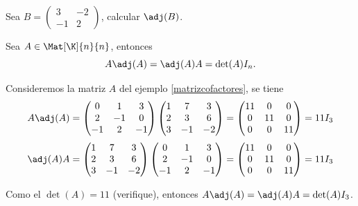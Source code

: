 \documentclass[compacto,10pt]{pubciencias-notas}
\begin{document}
\begin{ejer}\label{matcofej}
    Sea $B = 
    \begin{pmatrix}
        3 & -2 \\
        -1 & 2
    \end{pmatrix}$, calcular $\adj(B)$.   
\end{ejer}

\begin{teo}
Sea $A\in\Mat[\K]{n}{n}$, entonces
\[
    A \adj(A) = \adj(A) A = \det(A) I_{n}.
\]
\end{teo}

\begin{ejem}
    Consideremos la matriz $A$ del ejemplo \ref{matrizcofactores}, se tiene
    \[
        A \adj(A) = \begin{pmatrix}
            0 & 1 & 3 \\
            2 & -1 & 0 \\
            -1 & 2 & -1
        \end{pmatrix}
        \begin{pmatrix}
            1 & 7 & 3 \\
            2 & 3 & 6 \\
            3 & -1 & -2
        \end{pmatrix} = 
        \begin{pmatrix}
            11 & 0 & 0 \\
            0 & 11 & 0 \\
            0 & 0 & 11
        \end{pmatrix} = 11 I_{3}
    \]
    \[
        \adj(A) A = 
        \begin{pmatrix}
            1 & 7 & 3 \\
            2 & 3 & 6 \\
            3 & -1 & -2
        \end{pmatrix}
        \begin{pmatrix}
            0 & 1 & 3 \\
            2 & -1 & 0 \\
            -1 & 2 & -1
        \end{pmatrix} =
        \begin{pmatrix}
            11 & 0 & 0 \\
            0 & 11 & 0 \\
            0 & 0 & 11
        \end{pmatrix} = 11 I_{3}
    \]
    
    \noindent Como el $\det(A) = 11$ (verifique), entonces $A \adj(A) = \adj(A) A = \det(A) I_{3}$.
\end{ejem}
\end{document}
